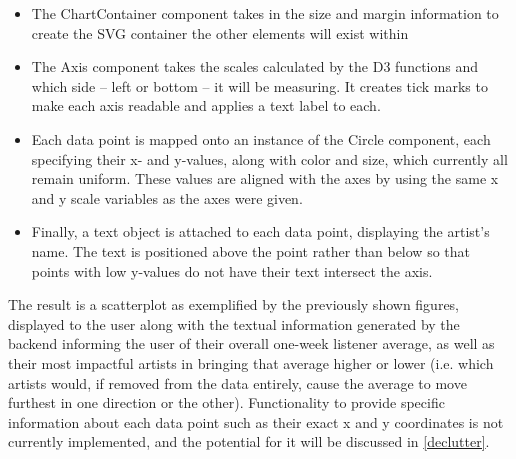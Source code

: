 \begin{itemize}
	\item The ChartContainer component takes in the size and margin information to create the SVG container the other elements will exist within
	\item The Axis component takes the scales calculated by the D3 functions and which side -- left or bottom -- it will be measuring. It creates tick marks to make each axis readable and applies a text label to each.
	\item Each data point is mapped onto an instance of the Circle component, each specifying their x- and y-values, along with color and size, which currently all remain uniform. These values are aligned with the axes by using the same x and y scale variables as the axes were given.
	\item Finally, a text object is attached to each data point, displaying the artist's name. The text is positioned above the point rather than below so that points with low y-values do not have their text intersect the axis.
\end{itemize}

The result is a scatterplot as exemplified by the previously shown figures, displayed to the user along with the textual information generated by the backend informing the user of their overall one-week listener average, as well as their most impactful artists in bringing that average higher or lower (i.e. which artists would, if removed from the data entirely, cause the average to move furthest in one direction or the other). Functionality to provide specific information about each data point such as their exact x and y coordinates is not currently implemented, and the potential for it will be discussed in \autoref{declutter}.